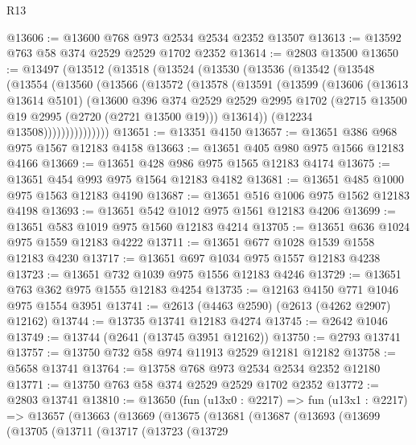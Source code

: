 \begin{lexlean}{R13}
\begin{coremodule}
@13606 := @13600 @768 @973 @2534 @2534 @2352 @13507
@13613 := @13592 @763 @58 @374 @2529 @2529 @1702 @2352
@13614 := @2803 @13500
@13650 := @13497
    (@13512
      (@13518
        (@13524
          (@13530
            (@13536
              (@13542
                (@13548
                  (@13554
                    (@13560
                      (@13566
                        (@13572
                          (@13578
                            (@13591
                              (@13599
                                (@13606
                                  (@13613 @13614 @5101)
                                  (@13600
                                    @396
                                    @374
                                    @2529
                                    @2529
                                    @2995
                                    @1702
                                    (@2715 @13500 @19 @2995 (@2720 (@2721 @13500 @19)))
                                    @13614))
                                (@12234 @13508)))))))))))))))
@13651 := @13351 @4150
@13657 := @13651 @386 @968 @975 @1567 @12183 @4158
@13663 := @13651 @405 @980 @975 @1566 @12183 @4166
@13669 := @13651 @428 @986 @975 @1565 @12183 @4174
@13675 := @13651 @454 @993 @975 @1564 @12183 @4182
@13681 := @13651 @485 @1000 @975 @1563 @12183 @4190
@13687 := @13651 @516 @1006 @975 @1562 @12183 @4198
@13693 := @13651 @542 @1012 @975 @1561 @12183 @4206
@13699 := @13651 @583 @1019 @975 @1560 @12183 @4214
@13705 := @13651 @636 @1024 @975 @1559 @12183 @4222
@13711 := @13651 @677 @1028 @1539 @1558 @12183 @4230
@13717 := @13651 @697 @1034 @975 @1557 @12183 @4238
@13723 := @13651 @732 @1039 @975 @1556 @12183 @4246
@13729 := @13651 @763 @362 @975 @1555 @12183 @4254
@13735 := @12163 @4150 @771 @1046 @975 @1554 @3951
@13741 := @2613 (@4463 @2590) (@2613 (@4262 @2907) @12162)
@13744 := @13735 @13741 @12183 @4274
@13745 := @2642 @1046
@13749 := @13744 (@2641 (@13745 @3951 @12162))
@13750 := @2793 @13741
@13757 := @13750 @732 @58 @974 @11913 @2529 @12181 @12182
@13758 := @5658 @13741
@13764 := @13758 @768 @973 @2534 @2534 @2352 @12180
@13771 := @13750 @763 @58 @374 @2529 @2529 @1702 @2352
@13772 := @2803 @13741
@13810 := @13650
    (fun (u13x0 : @2217) =>
    fun (u13x1 : @2217) =>
    @13657
      (@13663
        (@13669
          (@13675
            (@13681
              (@13687
                (@13693
                  (@13699
                    (@13705
                      (@13711
                        (@13717
                          (@13723
                            (@13729

\end{coremodule}
\end{lexlean}
